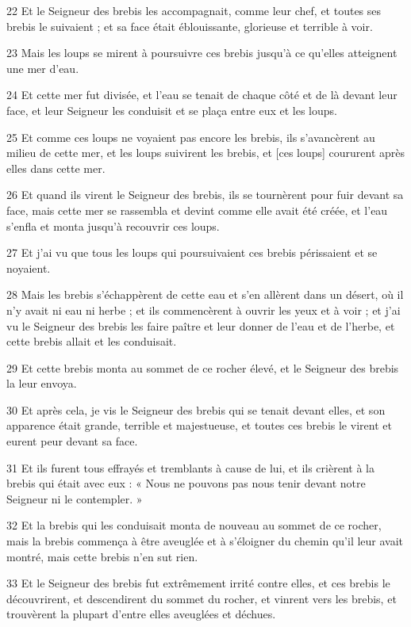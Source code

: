 \par 22 Et le Seigneur des brebis les accompagnait, comme leur chef, et toutes ses brebis le suivaient ; et sa face était éblouissante, glorieuse et terrible à voir.
\par 23 Mais les loups se mirent à poursuivre ces brebis jusqu'à ce qu'elles atteignent une mer d'eau.
\par 24 Et cette mer fut divisée, et l'eau se tenait de chaque côté et de là devant leur face, et leur Seigneur les conduisit et se plaça entre eux et les loups.
\par 25 Et comme ces loups ne voyaient pas encore les brebis, ils s'avancèrent au milieu de cette mer, et les loups suivirent les brebis, et [ces loups] coururent après elles dans cette mer.
\par 26 Et quand ils virent le Seigneur des brebis, ils se tournèrent pour fuir devant sa face, mais cette mer se rassembla et devint comme elle avait été créée, et l'eau s'enfla et monta jusqu'à recouvrir ces loups.
\par 27 Et j'ai vu que tous les loups qui poursuivaient ces brebis périssaient et se noyaient.
\par 28 Mais les brebis s'échappèrent de cette eau et s'en allèrent dans un désert, où il n'y avait ni eau ni herbe ; et ils commencèrent à ouvrir les yeux et à voir ; et j'ai vu le Seigneur des brebis les faire paître et leur donner de l'eau et de l'herbe, et cette brebis allait et les conduisait.
\par 29 Et cette brebis monta au sommet de ce rocher élevé, et le Seigneur des brebis la leur envoya.
\par 30 Et après cela, je vis le Seigneur des brebis qui se tenait devant elles, et son apparence était grande, terrible et majestueuse, et toutes ces brebis le virent et eurent peur devant sa face.
\par 31 Et ils furent tous effrayés et tremblants à cause de lui, et ils crièrent à la brebis qui était avec eux : « Nous ne pouvons pas nous tenir devant notre Seigneur ni le contempler. »
\par 32 Et la brebis qui les conduisait monta de nouveau au sommet de ce rocher, mais la brebis commença à être aveuglée et à s'éloigner du chemin qu'il leur avait montré, mais cette brebis n'en sut rien.
\par 33 Et le Seigneur des brebis fut extrêmement irrité contre elles, et ces brebis le découvrirent, et descendirent du sommet du rocher, et vinrent vers les brebis, et trouvèrent la plupart d'entre elles aveuglées et déchues.
